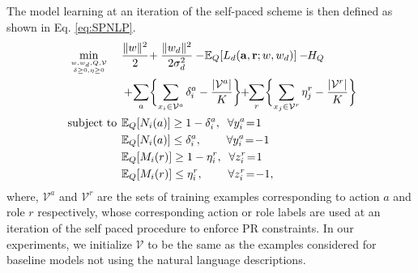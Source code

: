 \documentclass[10pt,twocolumn,letterpaper]{article}
\begin{document}
The model learning at an iteration of the self-paced scheme is then defined as shown in Eq. \ref{eq:SPNLP}.
{\small
\begin{equation}\label{eq:SPNLP}
\begin{aligned}
& \min \limits_{w, w_d, Q,\mathcal{V} \atop \delta \geq 0, \eta \geq 0} \hspace*{-19pt}
& \hspace*{-14pt} &  \frac{\|w \|^2}{2} \hspace*{-2pt} + \frac{\|w_d\|^2}{2 \sigma_d^2} - \hspace*{-2pt} \mathbb{E}_Q[L_{d}(\mathbf{a}, \mathbf{r}; w, w_d)]  - \hspace*{-3pt} H_{Q}   \\
&&&  + \hspace*{-2pt} \sum \limits_{a} \biggl\{ \sum \limits_{x_i \in \mathcal{V}^a}\delta_i^a - \frac{|\mathcal{V}^a|}{K} \biggr\} \hspace*{-3pt} + \hspace*{-3pt} \sum \limits_{r} \biggl\{ \sum \limits_{x_j \in \mathcal{V}^r} \eta_j^r - \frac{|\mathcal{V}^r|}{K} \biggr\}\hspace*{-3pt}\\
& \text{subject to} \hspace*{-6pt}
& & \mathbb{E}_Q [N_i(a)] \geq 1 - \delta_i^a, \;\; \forall y_i^a \hspace*{-2pt}=\hspace*{-2pt} 1 \\
&\hspace*{-3pt}&& \mathbb{E}_Q [N_i(a)] \leq \delta_i^a, \hspace*{22pt} \forall y_i^a \hspace*{-2pt}=\hspace*{-2pt} -1 \\
&\hspace*{-3pt}&& \mathbb{E}_Q [M_i(r)] \geq 1 - \eta_i^r, \;\; \forall z_i^r \hspace*{-2pt}=\hspace*{-2pt} 1 \\
&\hspace*{-3pt}&& \mathbb{E}_Q [M_i(r)] \leq \eta_i^r, \hspace*{22pt} \forall z_i^r \hspace*{-2pt}=\hspace*{-2pt} -1,
\end{aligned}
\end{equation}}where, $\mathcal{V}^a$ and $\mathcal{V}^r$ are the sets of training examples corresponding to action $a$ and role $r$ respectively, whose corresponding action or role  labels are used at an iteration of the self paced procedure to enforce PR constraints. In our experiments, we initialize $\mathcal{V}$ to be the same as the examples considered for baseline models not using the natural language descriptions.
\end{document}

